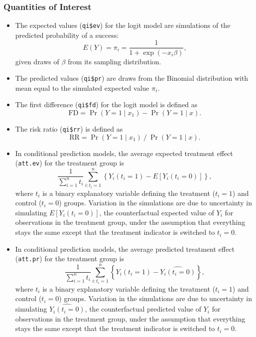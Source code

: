 \subsubsection{Quantities of Interest}
\begin{itemize}
\item The expected values ({\tt qi\$ev}) for the logit model are
  simulations of the predicted probability of a success: $$E(Y) =
  \pi_i= \frac{1}{1 + \exp(-x_i \beta)},$$ given draws of $\beta$ from
  its sampling distribution.

\item The predicted values ({\tt qi\$pr}) are draws from the Binomial
  distribution with mean equal to the simulated expected value $\pi_i$.  

\item The first difference ({\tt qi\$fd}) for the logit model is defined as
\begin{equation*}
\textrm{FD} = \Pr(Y = 1 \mid x_1) - \Pr(Y = 1 \mid x).
\end{equation*}

\item The risk ratio ({\tt qi\$rr}) is defined as
\begin{equation*}
\textrm{RR} = \Pr(Y = 1 \mid x_1) \ / \ \Pr(Y = 1 \mid x).
\end{equation*}

\item In conditional prediction models, the average expected treatment
  effect ({\tt att.ev}) for the treatment group is 
    \begin{equation*} \frac{1}{\sum_{i=1}^n t_i}\sum_{i:t_i=1}^n \left\{ Y_i(t_i=1) -
      E[Y_i(t_i=0)] \right\},
    \end{equation*} 
    where $t_i$ is a binary explanatory variable defining the treatment
    ($t_i=1$) and control ($t_i=0$) groups.  Variation in the
    simulations are due to uncertainty in simulating $E[Y_i(t_i=0)]$,
    the counterfactual expected value of $Y_i$ for observations in the
    treatment group, under the assumption that everything stays the
    same except that the treatment indicator is switched to $t_i=0$.

\item In conditional prediction models, the average predicted treatment
  effect ({\tt att.pr}) for the treatment group is 
    \begin{equation*} \frac{1}{\sum_{i=1}^n t_i}\sum_{i:t_i=1}^n \left\{ Y_i(t_i=1) -
      \widehat{Y_i(t_i=0)}\right\},
    \end{equation*} 
    where $t_i$ is a binary explanatory variable defining the
    treatment ($t_i=1$) and control ($t_i=0$) groups.  Variation in
    the simulations are due to uncertainty in simulating
    $\widehat{Y_i(t_i=0)}$, the counterfactual predicted value of
    $Y_i$ for observations in the treatment group, under the
    assumption that everything stays the same except that the
    treatment indicator is switched to $t_i=0$.
\end{itemize}

